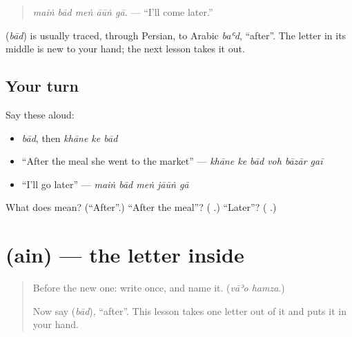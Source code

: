 \begin{quote}
\textbf{    }
\end{quote}

\begin{quote}
\emph{maiṅ bād meṅ āūṅ gā.} — \textquotedblleft{}I'll come later.\textquotedblright{}
\end{quote}

\begin{cousinweb}
\textbf{} (\emph{bād}) is usually traced, through Persian, to Arabic \emph{baʿd}, \textquotedblleft{}after\textquotedblright{}. The letter in its middle is new to your hand; the next lesson takes it out.
\end{cousinweb}

\subsection*{Your turn}
Say these aloud:

\begin{itemize}
\raggedright
  \item \emph{bād}, then \emph{khāne ke bād}
  \item \textquotedblleft{}After the meal she went to the market\textquotedblright{} — \emph{khāne ke bād voh bāzār gaī}
  \item \textquotedblleft{}I'll go later\textquotedblright{} — \emph{maiṅ bād meṅ jāūṅ gā}
\end{itemize}

\begin{tcolorbox}[breakable,colback=teal!4,colframe=teal!35!black,title={Before you move on}]
What does \textbf{} mean? (\textquotedblleft{}After\textquotedblright{}.) \textquotedblleft{}After the meal\textquotedblright{}? (\textbf{  }.) \textquotedblleft{}Later\textquotedblright{}? (\textbf{ }.)
\end{tcolorbox}
\section[\texorpdfstring{\ur{ع} (ain)}{ع (ain)}]{ (ain) — the letter inside }

\label{lesson:UR-W267-ain}



\begin{quote}
Before the new one: write  once, and name it. (\emph{vāʾo hamza}.)

Now say \textbf{} (\emph{bād}), \textquotedblleft{}after\textquotedblright{}. This lesson takes one letter out of it and puts it in your hand.
\end{quote}

